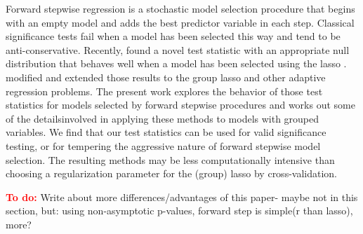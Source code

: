 \documentclass{imsart}
\newcommand{\todo}{\textcolor{red}{\textbf{To do: }}}
\begin{document}
Forward stepwise regression is a stochastic model selection procedure
that begins with an empty model and adds the best predictor variable
in each step.  Classical significance tests fail when a model has been
selected this way and tend to be anti-conservative.  Recently,
\cite{significance:lasso} found a novel test statistic with an
appropriate null distribution that behaves well when a model has been
selected using the lasso \citep{tibshirani:lasso}.
\cite{tests:adaptive} modified and extended those results to the
group lasso \citep{grouplasso} and other adaptive regression
problems.  The present work explores the behavior of those test
statistics for models selected by forward stepwise procedures and
works out some of the detailsinvolved in applying these methods to
models with grouped variables. We find that our test statistics can be
used for valid significance testing, or for tempering the aggressive
nature of forward stepwise model selection.  The resulting methods may
be less computationally intensive than choosing a regularization
parameter for the (group) lasso by cross-validation. 


\todo Write about more differences/advantages of this paper- maybe not
in this section, but: using non-asymptotic p-values, forward step is
simple(r than lasso), more?
\end{document}
